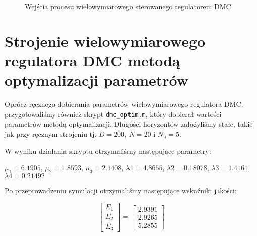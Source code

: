 \begin{figure}
    \begin{subfigure}[b]{\textwidth}
        \centering
    \end{subfigure}
    \caption{Wejścia procesu wielowymiarowego sterowanego regulatorem DMC}
    \label{pro_dmc_2_in}
\end{figure}
\FloatBarrier

\section{Strojenie wielowymiarowego regulatora DMC metodą optymalizacji parametrów}
\label{pro_dmc_optymalizacja}

Oprócz ręcznego dobierania parametrów wielowymiarowego regulatora DMC, przygotowaliśmy również 
skrypt \verb+dmc_optim.m+, który dobierał wartości parametrów metodą optymalizacji. Długości horyzontów
założyliśmy stałe, takie jak przy ręcznym strojeniu tj. $D = \num{200}$, $N = \num{20}$ i $N_{\mathrm{u}} = \num{5}$.

W wyniku działania skryptu otrzymaliśmy następujące parametry:

\begin{center}
    $\mu_{1} = \num{6.1905}$, $\mu_{2} = \num{1.8593}$, $\mu_{3} = \num{2.1408}$,
    $\lambda{1} = \num{4.8655}$, $\lambda{2} = \num{0.18078}$, $\lambda{3} = \num{1.4161}$, $\lambda{4} = \num{0.21492}$
\end{center}

Po przeprowadzeniu symulacji otrzymaliśmy następujące wskaźniki jakości:

\[
\begin{bmatrix}
    E_{\mathrm{1}} \\
    E_{\mathrm{2}} \\
    E_{\mathrm{3}} 
\end{bmatrix}
= 
\begin{bmatrix}
    \num{2.9391} \\
    \num{2.9265} \\
    \num{5.2855}
\end{bmatrix}
\]

